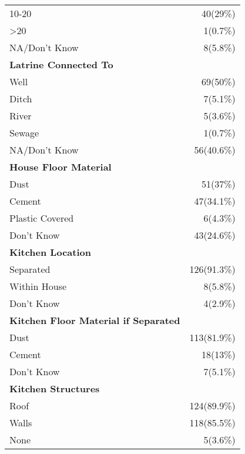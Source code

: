 \documentclass[4pt,letterpaper]{article}
\begin{document}
\begin{multicols}{2}
\begin{center}
\begin{tabular}{p{5cm}r}
10-20 & 40(29\%) \\
\textgreater 20 & 1(0.7\%) \\
NA/Don't Know & 8(5.8\%) \\
\midrule
\textbf{Latrine Connected To} & \\
Well & 69(50\%) \\
Ditch & 7(5.1\%) \\
River & 5(3.6\%) \\
Sewage & 1(0.7\%) \\
NA/Don't Know & 56(40.6\%) \\
\midrule
\textbf{House Floor Material} & \\
Dust & 51(37\%) \\
Cement & 47(34.1\%) \\
Plastic Covered & 6(4.3\%) \\
Don't Know & 43(24.6\%) \\
\midrule
\textbf{Kitchen Location} & \\
Separated & 126(91.3\%) \\
Within House & 8(5.8\%) \\
Don't Know & 4(2.9\%) \\
\midrule
\textbf{Kitchen Floor Material if Separated} & \\
Dust & 113(81.9\%) \\
Cement & 18(13\%) \\
Don't Know & 7(5.1\%) \\
\midrule
\textbf{Kitchen Structures} & \\
Roof & 124(89.9\%) \\
Walls & 118(85.5\%) \\
None & 5(3.6\%) \\
\bottomrule
\end{tabular}
\end{center}


\end{multicols}
\end{document}
